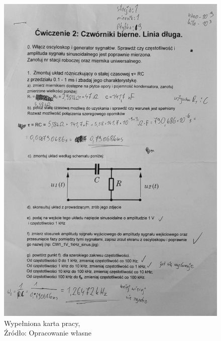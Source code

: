 \documentclass{article}
\begin{document}
    \begin{figure}[!ht]
      \centering
      \begin{minipage}{.4\textwidth}
        \centering
        \includegraphics[scale=0.15]{grafiki/notatki_3.jpg}
        \caption{Wypełniona karta pracy,
          \\Źródło: Opracowanie własne}
      \end{minipage}
      \begin{minipage}{.4\textwidth}
        \centering

\end{minipage}
\end{figure}
\end{document}
